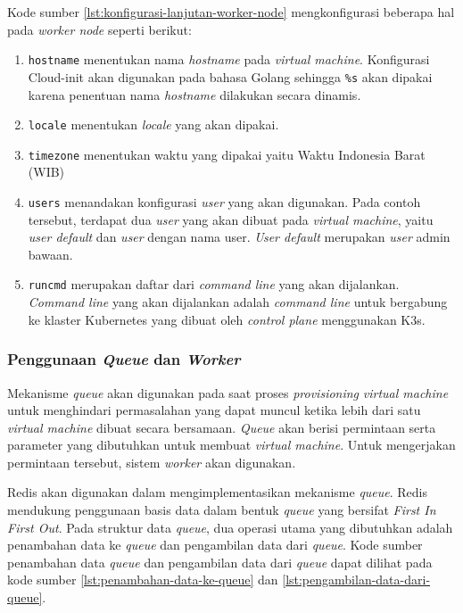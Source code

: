 Kode sumber \ref{lst:konfigurasi-lanjutan-worker-node}
mengkonfigurasi beberapa hal pada \emph{worker node} seperti berikut:

\begin{enumerate}
  
  \item \lstinline{hostname} menentukan nama \emph{hostname} pada \emph{virtual machine}.
    Konfigurasi Cloud-init akan digunakan pada bahasa Golang sehingga \lstinline{%s}
    akan dipakai karena penentuan nama \emph{hostname} dilakukan secara dinamis.

  \item \lstinline{locale} menentukan \emph{locale} yang akan dipakai.

  \item \lstinline{timezone} menentukan waktu yang dipakai yaitu Waktu Indonesia Barat (WIB)

  \item \lstinline{users} menandakan konfigurasi \emph{user} yang akan digunakan. Pada
    contoh tersebut, terdapat dua \emph{user} yang akan dibuat pada \emph{virtual machine},
    yaitu \emph{user default} dan \emph{user} dengan nama user. \emph{User default} merupakan
    \emph{user} admin bawaan.

  \item \lstinline{runcmd} merupakan daftar dari \emph{command line} yang akan dijalankan.
    \emph{Command line} yang akan dijalankan adalah \emph{command line} untuk bergabung ke
    klaster Kubernetes yang dibuat oleh \emph{control plane} menggunakan K3s.

\end{enumerate}

\subsubsection{Penggunaan \emph{Queue} dan \emph{Worker}}
\label{sec:implementasi-queue-dan-worker}

Mekanisme \emph{queue} akan digunakan pada saat proses \emph{provisioning}
\emph{virtual machine} untuk menghindari permasalahan yang dapat muncul ketika
lebih dari satu \emph{virtual machine} dibuat secara bersamaan. \emph{Queue}
akan berisi permintaan serta parameter yang dibutuhkan untuk membuat
\emph{virtual machine}. Untuk mengerjakan permintaan tersebut, sistem \emph{worker}
akan digunakan.

Redis akan digunakan dalam mengimplementasikan mekanisme \emph{queue}. Redis mendukung
penggunaan basis data dalam bentuk \emph{queue} yang bersifat \emph{First In First Out}.
Pada struktur data \emph{queue}, dua operasi utama yang dibutuhkan adalah penambahan data
ke \emph{queue} dan pengambilan data dari \emph{queue}. Kode sumber penambahan data \emph{queue}
dan pengambilan data dari \emph{queue} dapat dilihat pada kode sumber
\ref{lst:penambahan-data-ke-queue} dan \ref{lst:pengambilan-data-dari-queue}.


